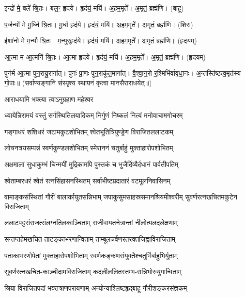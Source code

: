 इन्द्रो॑ मे॒ बले᳚ श्रि॒तः। बल॒ꣳ॒ हृद॑ये। हृद॑यं॒ मयि॑। अ॒हम॒मृते᳚। अ॒मृतं॒ ब्रह्म॑णि। (बाहू)

प॒र्जन्यो॑ मे मू॒र्ध्नि श्रि॒तः। मू॒र्धा हृद॑ये। हृद॑यं॒ मयि॑। अ॒हम॒मृते᳚। अ॒मृतं॒ ब्रह्म॑णि। (शिरः)

ईशा॑नो मे म॒न्यौ श्रि॒तः। म॒न्युर्‌हृद॑ये। हृद॑यं॒ मयि॑। अ॒हम॒मृते᳚। अ॒मृतं॒ ब्रह्म॑णि। (हृदयम्)

आ॒त्मा म॑ आ॒त्मनि॑ श्रि॒तः। आ॒त्मा हृद॑ये। हृद॑यं॒ मयि॑। अ॒हम॒मृते᳚। अ॒मृतं॒ ब्रह्म॑णि।
(हृदयम्)

पुन॑र्म आ॒त्मा पुन॒रायु॒रागा᳚त्। पुनः॑ प्रा॒णः पुन॒राकू॑त॒मागा᳚त्। वै॒श्वा॒न॒रो र॒श्मिभि॑र्वावृधा॒नः। अ॒न्तस्ति॑ष्ठत्व॒मृत॑स्य गो॒पाः॥ (सर्वाण्यङ्गानि संस्पृश्य स्थापनं कृत्वा मानसैराराधयेत्॥)

{\small\closesection}


{आराधयामि भक्त्या त्वाऽनुग्रहाण महेश्वर}



\twolineshloka
{ध्यायेन्निरामयं वस्तुं सर्गस्थितिलयादिकम्}
{निर्गुणं निष्कलं नित्यं मनोवाचामगोचरम्}

\twolineshloka
{गङ्गाधरं शशिधरं जटामकुटशोभितम्}
{श्वेतभूतित्रिपुण्ड्रेण विराजितललाटकम्}

\twolineshloka
{लोचनत्रयसम्पन्नं स्वर्णकुण्डलशोभितम्}
{स्मेराननं चतुर्बाहुं मुक्ताहारोपशोभितम्}

\twolineshloka
{अक्षमालां सुधाकुम्भं चिन्मयीं मुद्रिकामपि}
{पुस्तकं च भुजैर्दिव्यैर्दधानं पार्वतीपतिम्}

\twolineshloka
{श्वेताम्बरधरं श्वेतं रत्नसिंहासनस्थितम्}
{सर्वाभीष्टप्रदातारं वटमूलनिवासिनम्}

\threelineshloka
{वामाङ्कसंस्थितां गौरीं बालार्कायुतसन्निभाम्}
{जपाकुसुमसाहस्रसमानश्रियमीश्वरीम्}
{सुवर्णरत्नखचितमकुटेन विराजिताम्}

\twolineshloka
{ललाटपट्टसंराजत्संलग्नतिलकाञ्चिताम्}
{राजीवायतनेत्रान्तां नीलोत्पलदलेक्षणाम्}

\twolineshloka
{सन्तप्तहेमखचित-ताटङ्काभरणान्विताम्}
{ताम्बूलचर्वणरतरक्तजिह्वाविराजिताम्}

\twolineshloka
{पताकाभरणोपेतां मुक्ताहारोपशोभिताम्}
{स्वर्णकङ्कणसंयुक्तैश्चतुर्भिर्बाहुभिर्युताम्}

\twolineshloka
{सुवर्णरत्नखचित-काञ्चीदामविराजिताम्}
{कदलीललितस्तम्भ-सन्निभोरुयुगान्विताम्}

\twolineshloka
{श्रिया विराजितपदां भक्तत्राणपरायणाम्}
{अन्योन्याश्लिष्टहृद्बाहू गौरीशङ्करसंज्ञकम्}


